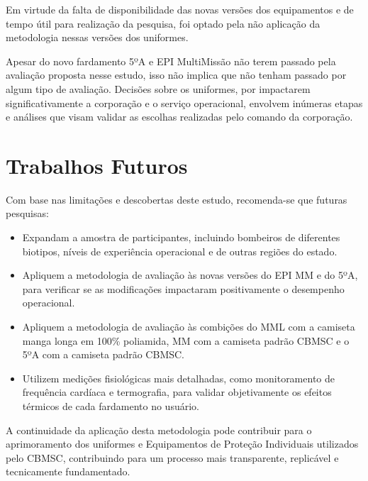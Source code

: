             Em virtude da falta de disponibilidade das novas versões dos equipamentos e de tempo útil 
            para realização da pesquisa, foi optado pela não aplicação da metodologia nessas 
            versões dos uniformes.

            Apesar do novo fardamento 5ºA e \acrshort{EPI} MultiMissão não terem passado pela avaliação proposta nesse estudo, 
            isso não implica que não tenham passado por algum tipo de avaliação. Decisões sobre os uniformes, 
            por impactarem significativamente a corporação e o serviço operacional, envolvem inúmeras etapas e 
            análises que visam validar as escolhas realizadas pelo comando da corporação. 

    \section{Trabalhos Futuros}
        Com base nas limitações e descobertas deste estudo, recomenda-se que futuras pesquisas:

        \begin{itemize}
            \item Expandam a amostra de participantes, incluindo bombeiros de diferentes biotipos, 
            níveis de experiência operacional e de outras regiões do estado.
            \item Apliquem a metodologia de avaliação às novas versões do \acrshort{EPI} \acrshort{MM} 
            e do 5ºA, para verificar se as modificações impactaram positivamente o desempenho operacional.
            \item Apliquem a metodologia de avaliação às combições do \acrshort{MML} com a camiseta manga 
            longa em 100\% poliamida, \acrshort{MM} com a camiseta padrão \acrshort{CBMSC} e o 5ºA com 
            a camiseta padrão \acrshort{CBMSC}.
            \item Utilizem medições fisiológicas mais detalhadas, como monitoramento de frequência 
            cardíaca e termografia, para validar objetivamente os efeitos térmicos de cada fardamento no usuário.
        \end{itemize}

        A continuidade da aplicação desta metodologia pode contribuir para o aprimoramento dos uniformes e
        Equipamentos de Proteção Individuais utilizados pelo \acrshort{CBMSC}, contribuindo para um processo 
        mais transparente, replicável e tecnicamente fundamentado.